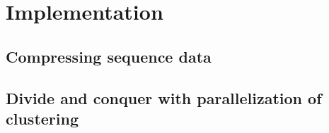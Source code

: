 \section{Implementation} \label{sec:implementation} %

\subsection{Compressing sequence data}

\subsection{Divide and conquer with parallelization of clustering}
